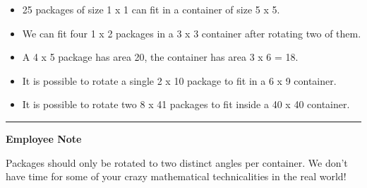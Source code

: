 \begin{itemize}
    \item 25 packages of size 1 x 1 can fit in a container of size 5 x 5.

    \item We can fit four 1 x 2 packages in a 3 x 3 container after rotating two of them.
    
    \item A 4 x 5 package has area 20, the container has area 3 x 6 = 18.
    
    \item It is possible to rotate a single 2 x 10 package to fit in a 6 x 9 container.
    
    \item It is possible to rotate two 8 x 41 packages to fit inside a 40 x 40 container.
\end{itemize}

\vspace{8pt}
\hrule

\textbf{Employee Note}

Packages should only be rotated to two distinct angles per container. We don't have time for some of your crazy mathematical technicalities in the real world!